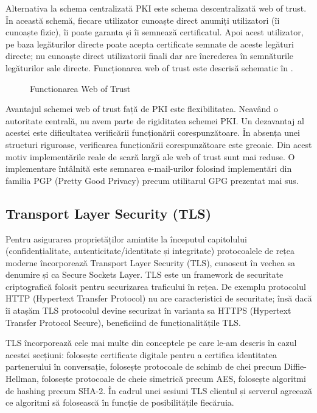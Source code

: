 Alternativa la schema centralizată PKI este schema descentralizată web of trust. În această schemă, fiecare utilizator cunoaște direct anumiți utilizatori (îi cunoaște fizic), îi poate garanta și îi semnează certificatul. Apoi acest utilizator, pe baza legăturilor directe poate acepta certificate semnate de aceste legături directe; nu cunoaște direct utilizatorii finali dar are încrederea în semnăturile legăturilor sale directe. Funcționarea web of trust este descrisă schematic în .

\begin{figure}[htbp]
  \centering
  \def\svgwidth{\columnwidth}
  
  \caption{Functionarea Web of Trust}
  \label{fig:sec:wot}
\end{figure}

Avantajul schemei web of trust față de PKI este flexibilitatea. Neavând o autoritate centrală, nu avem parte de rigiditatea schemei PKI. Un dezavantaj al acestei este dificultatea verificării funcționării corespunzătoare. În absența unei structuri riguroase, verificarea funcționării corespunzătoare este greoaie. Din acest motiv implementările reale de scară largă ale web of trust sunt mai reduse. O implementare întâlnită este semnarea e-mail-urilor folosind implementări din familia PGP (Pretty Good Privacy) precum utilitarul GPG prezentat mai sus.

\subsection{Transport Layer Security (TLS)}
\label{sec:sec:tls}

Pentru asigurarea proprietăților amintite la începutul capitolului (confidențialitate, autenticitate/identitate și integritate) protocoalele de rețea moderne încorporează Transport Layer Security (TLS), cunoscut în vechea sa denumire și ca Secure Sockets Layer. TLS este un framework de securitate criptografică folosit pentru securizarea traficului în rețea. De exemplu protocolul HTTP (Hypertext Transfer Protocol) nu are caracteristici de securitate; însă dacă îi atașăm TLS protocolul devine securizat în varianta sa HTTPS (Hypertext Transfer Protocol Secure), beneficiind de funcționalitățile TLS.

TLS încorporează cele mai multe din conceptele pe care le-am descris în cazul acestei secțiuni: folosește certificate digitale pentru a certifica identitatea partenerului în conversație, folosește protocoale de schimb de chei precum Diffie-Hellman, folosește protocoale de cheie simetrică precum AES, folosește algoritmi de hashing precum SHA-2. În cadrul unei sesiuni TLS clientul și serverul agreează ce algoritmi să folosească în funcție de posibilitățile fiecăruia.

